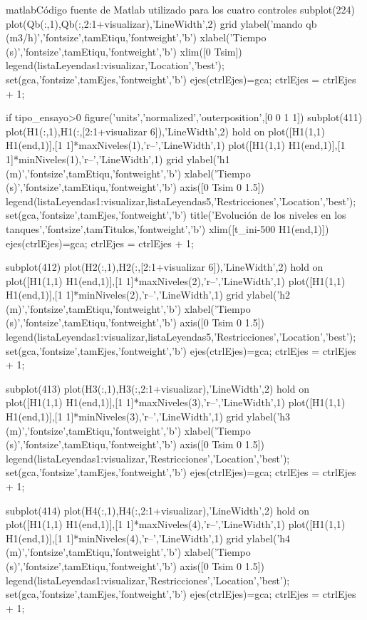 \begin{anexo}
\begin{sourcecode}{matlab}{Código fuente de Matlab utilizado para los cuatro controles}
subplot(224)
plot(Qb(:,1),Qb(:,2:1+visualizar),'LineWidth',2)
grid
ylabel('mando qb (m3/h)','fontsize',tamEtiqu,'fontweight','b')
xlabel('Tiempo (s)','fontsize',tamEtiqu,'fontweight','b')
xlim([0 Tsim])
legend(listaLeyendas{1:visualizar},'Location','best');
set(gca,'fontsize',tamEjes,'fontweight','b')
ejes(ctrlEjes)=gca;
ctrlEjes = ctrlEjes + 1;

if tipo_ensayo>0
    figure('units','normalized','outerposition',[0 0 1 1])
    subplot(411)
    plot(H1(:,1),H1(:,[2:1+visualizar 6]),'LineWidth',2)
    hold on
    plot([H1(1,1) H1(end,1)],[1 1]*maxNiveles(1),'r--','LineWidth',1)
    plot([H1(1,1) H1(end,1)],[1 1]*minNiveles(1),'r--','LineWidth',1)
    grid
    ylabel('h1 (m)','fontsize',tamEtiqu,'fontweight','b')
    xlabel('Tiempo (s)','fontsize',tamEtiqu,'fontweight','b')
    axis([0 Tsim 0 1.5])
    legend(listaLeyendas{1:visualizar},listaLeyendas{5},'Restricciones','Location','best');
    set(gca,'fontsize',tamEjes,'fontweight','b')
    title('Evolución de los niveles en los tanques','fontsize',tamTitulos,'fontweight','b')
    xlim([t_ini-500 H1(end,1)])
    ejes(ctrlEjes)=gca;
    ctrlEjes = ctrlEjes + 1;
    
    subplot(412)
    plot(H2(:,1),H2(:,[2:1+visualizar 6]),'LineWidth',2)
    hold on
    plot([H1(1,1) H1(end,1)],[1 1]*maxNiveles(2),'r--','LineWidth',1)
    plot([H1(1,1) H1(end,1)],[1 1]*minNiveles(2),'r--','LineWidth',1)
    grid
    ylabel('h2 (m)','fontsize',tamEtiqu,'fontweight','b')
    xlabel('Tiempo (s)','fontsize',tamEtiqu,'fontweight','b')
    axis([0 Tsim 0 1.5])
    legend(listaLeyendas{1:visualizar},listaLeyendas{5},'Restricciones','Location','best');
    set(gca,'fontsize',tamEjes,'fontweight','b')
    ejes(ctrlEjes)=gca;
    ctrlEjes = ctrlEjes + 1;
    
    subplot(413)
    plot(H3(:,1),H3(:,2:1+visualizar),'LineWidth',2)
    hold on
    plot([H1(1,1) H1(end,1)],[1 1]*maxNiveles(3),'r--','LineWidth',1)
    plot([H1(1,1) H1(end,1)],[1 1]*minNiveles(3),'r--','LineWidth',1)
    grid
    ylabel('h3 (m)','fontsize',tamEtiqu,'fontweight','b')
    xlabel('Tiempo (s)','fontsize',tamEtiqu,'fontweight','b')
    axis([0 Tsim 0 1.5])
    legend(listaLeyendas{1:visualizar},'Restricciones','Location','best');
    set(gca,'fontsize',tamEjes,'fontweight','b')
    ejes(ctrlEjes)=gca;
    ctrlEjes = ctrlEjes + 1;
    
    subplot(414)
    plot(H4(:,1),H4(:,2:1+visualizar),'LineWidth',2)
    hold on
    plot([H1(1,1) H1(end,1)],[1 1]*maxNiveles(4),'r--','LineWidth',1)
    plot([H1(1,1) H1(end,1)],[1 1]*minNiveles(4),'r--','LineWidth',1)
    grid
    ylabel('h4 (m)','fontsize',tamEtiqu,'fontweight','b')
    xlabel('Tiempo (s)','fontsize',tamEtiqu,'fontweight','b')
    axis([0 Tsim 0 1.5])
    legend(listaLeyendas{1:visualizar},'Restricciones','Location','best');
    set(gca,'fontsize',tamEjes,'fontweight','b')
    ejes(ctrlEjes)=gca;
    ctrlEjes = ctrlEjes + 1;
    

\end{sourcecode}
\end{anexo}
